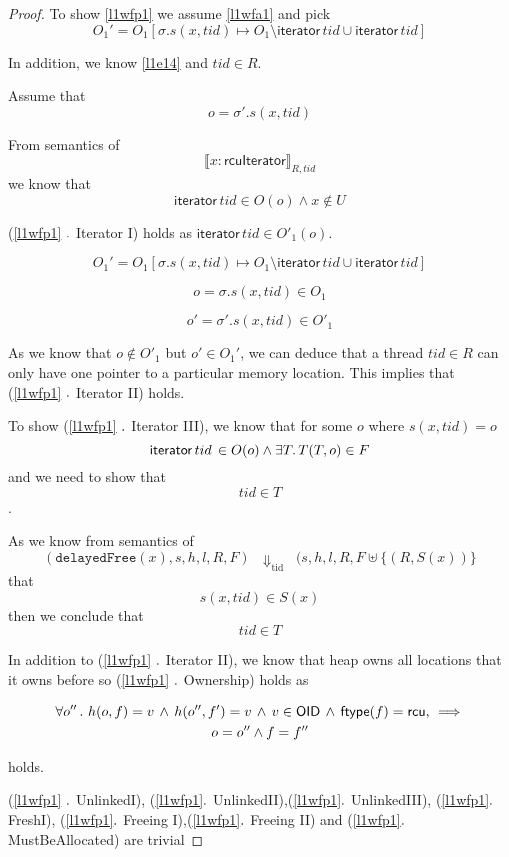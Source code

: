 \begin{proof}

To show \ref{l1wfp1} we assume \ref{l1wfa1} and pick
\[
O_{1}'  = O_{1}[\sigma.s(x,tid) \mapsto O_{1} \setminus \mathsf{iterator} \,  tid \cup \mathsf{iterator} \, tid]
\]

In addition, we know \ref{l1e14} and $tid  \in R$.

Assume that \[ o = \sigma'.s(x,tid)\]

From semantics of \[ \llbracket x:\mathsf{rcuIterator} \rrbracket_{R,tid} \] we know that \[ \mathsf{iterator} \, tid \in O(o) \land x\notin U \]

(\ref{l1wfp1} $\ldotp$ \textsf{Iterator I}) holds as $\mathsf{iterator} \, tid \in O'_{1}(o)$.

 
\[
O_{1}'  = O_{1}[\sigma.s(x,tid) \mapsto O_{1} \setminus \mathsf{iterator} \,  tid  \cup \mathsf{iterator} \, tid]
\]

\[ o = \sigma.s(x,tid) \in O_{1}\]

\[ o' = \sigma'.s(x,tid) \in O'_{1}\]


 As we know that $o \notin O'_{1}$ but $o' \in O_{1}'$, we can deduce that a thread $tid \in R$ can only have one pointer to a particular memory location.  This implies that (\ref{l1wfp1} $\ldotp$ \textsf{Iterator II}) holds. 

To show (\ref{l1wfp1} $\ldotp$ \textsf{Iterator III}), we know that for some $o$  where $s(x,tid) = o$
\[ \mathsf{iterator} \, tid\, \in O(o) \land  \exists T \ldotp T(T,o) \in F\]
and we need to show that 
\[tid \in T\].

As we know from semantics of 
\[
(\texttt{delayedFree}(x), s,h,l,R,F) 
\;\;\Downarrow_{\mathrm{tid}}\;\;
(s,h,l,R,F \uplus \{ (R,S(x))\} 
\]
that
\[s(x,tid) \in S(x)\]
then we conclude that 
\[tid \in T\]

In addition to (\ref{l1wfp1} $\ldotp$ \textsf{Iterator II}), we know that heap owns all locations that it owns before so  (\ref{l1wfp1} $\ldotp$ \textsf{Ownership}) holds as

\begin{gather*}
 \forall  o'' \, \ldotp \, h(o,f) = v \, \land \, h(o'',f') = v\, \land \, v \in  \mathsf{OID} \, \land \, \mathsf{ftype}(f) = \mathsf{rcu}, \, \implies \\
 o=o'' \land f=f'' \end{gather*}

holds.

(\ref{l1wfp1} $\ldotp$ \textsf{UnlinkedI}), (\ref{l1wfp1}$\ldotp$ \textsf{UnlinkedII}),(\ref{l1wfp1}$\ldotp$ \textsf{UnlinkedIII}), (\ref{l1wfp1}$\ldotp$ \textsf{FreshI}), (\ref{l1wfp1}$\ldotp$ \textsf{Freeing I}),(\ref{l1wfp1}$\ldotp$ \textsf{Freeing II}) and (\ref{l1wfp1}$\ldotp$ \textsf{MustBeAllocated}) are trivial



\end{proof}
